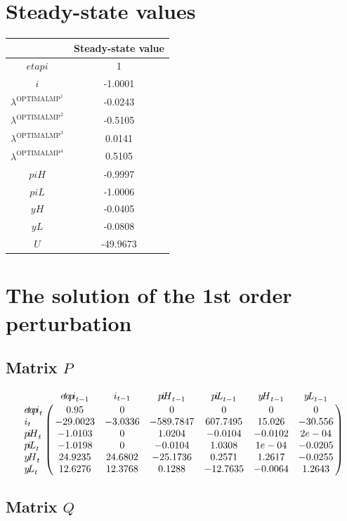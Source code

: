

\section{Steady-state values}


\begin{tabular}{c|c|}
  & Steady-state value\\
\hline
${e\!t\!a\!p\!i}$ & 1 \\
$i$ & -1.0001 \\
$\lambda^{\mathrm{OPTIMALMP}^{\mathrm{1}}}$ & -0.0243 \\
$\lambda^{\mathrm{OPTIMALMP}^{\mathrm{2}}}$ & -0.5105 \\
$\lambda^{\mathrm{OPTIMALMP}^{\mathrm{3}}}$ & 0.0141 \\
$\lambda^{\mathrm{OPTIMALMP}^{\mathrm{4}}}$ & 0.5105 \\
${p\!i\!H}$ & -0.9997 \\
${p\!i\!L}$ & -1.0006 \\
${y\!H}$ & -0.0405 \\
${y\!L}$ & -0.0808 \\
$U$ & -49.9673 \\
\hline
\end{tabular}


\section{The solution of the 1st order perturbation}

\subsection*{Matrix $P$}

$$\bordermatrix{
~ & {e\!t\!a\!p\!i}_{t-1} & i_{t-1} & {p\!i\!H}_{t-1} & {p\!i\!L}_{t-1} & {y\!H}_{t-1} & {y\!L}_{t-1} \cr
{e\!t\!a\!p\!i}_{t} & 0.95 & 0 & 0 & 0 & 0 & 0 \cr
i_{t} & -29.0023 & -3.0336 & -589.7847 & 607.7495 & 15.026 & -30.556 \cr
{p\!i\!H}_{t} & -1.0103 & 0 & 1.0204 & -0.0104 & -0.0102 & 2e-04 \cr
{p\!i\!L}_{t} & -1.0198 & 0 & -0.0104 & 1.0308 & 1e-04 & -0.0205 \cr
{y\!H}_{t} & 24.9235 & 24.6802 & -25.1736 & 0.2571 & 1.2617 & -0.0255 \cr
{y\!L}_{t} & 12.6276 & 12.3768 & 0.1288 & -12.7635 & -0.0064 & 1.2643 \cr
}$$

\subsection*{Matrix $Q$}

